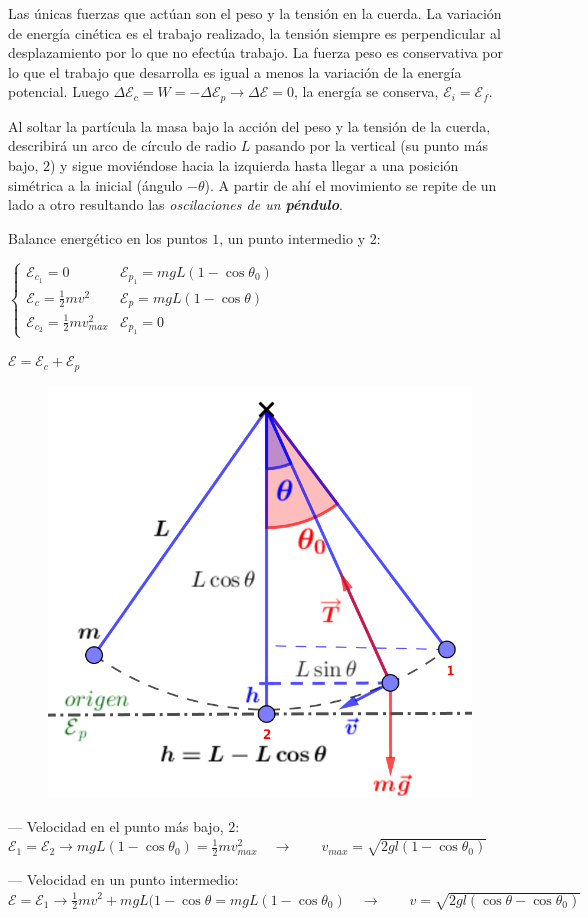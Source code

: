 Las únicas fuerzas que actúan son el peso y la tensión en la cuerda. La variación de energía cinética es el trabajo realizado, la tensión siempre es perpendicular al desplazamiento por lo que no efectúa trabajo. La fuerza peso es conservativa por lo que el trabajo que desarrolla es igual a menos la variación de la energía potencial. Luego $\Delta \mathcal E_c=W=-\Delta \mathcal E_p \to \Delta \mathcal E=0$, la energía se conserva, $\mathcal E_i=\mathcal E_f$.


Al soltar la partícula la masa bajo la acción del peso y la tensión de la cuerda, describirá un arco de círculo de radio $L$ pasando por la vertical (su punto más bajo, $2$) y sigue moviéndose hacia la izquierda hasta llegar a una posición simétrica a la inicial (ángulo $-\theta$). A partir de ahí el movimiento se repite de un lado a otro resultando las \emph{oscilaciones de un \textbf{péndulo}}.


\begin{multicols}{2}

Balance energético en los puntos $1$, un punto intermedio y $2$:

$\begin{cases}
\mathcal E_{c_1}=0 & \mathcal E_{p_1}=mgL(1-\cos \theta_0) \\
\mathcal E_{c}=\frac 1 2 m v^2 & \mathcal E_{p}=mgL(1-\cos \theta) \\
\mathcal E_{c_2}=\frac 1 2 m v_{max}^2 & \mathcal E_{p_1}=0
\end{cases}$

$\mathcal E = \mathcal E_c+\mathcal E_p$
	\begin{figure}[H]
	\centering
	\includegraphics[width=.3\textwidth]{imagenes/imagenes04/T04IM15.png}
\end{figure}
\end{multicols}
--- Velocidad en el punto más bajo, $2$: $\mathcal E_1=\mathcal E_2 \to mgL(1-\cos \theta_0)=\frac 1 2 m v_{max}^2 \quad \to \qquad v_{max}=\sqrt{2gl(1-\cos \theta_0)}$

--- Velocidad en un punto intermedio: $\mathcal E=\mathcal E_1 \to \frac 1 2 m v^2+mgL(1-\cos \theta= mgL(1-\cos \theta_0) \quad \to \qquad v=\sqrt{2gl(\cos \theta-\cos \theta_0)}$

